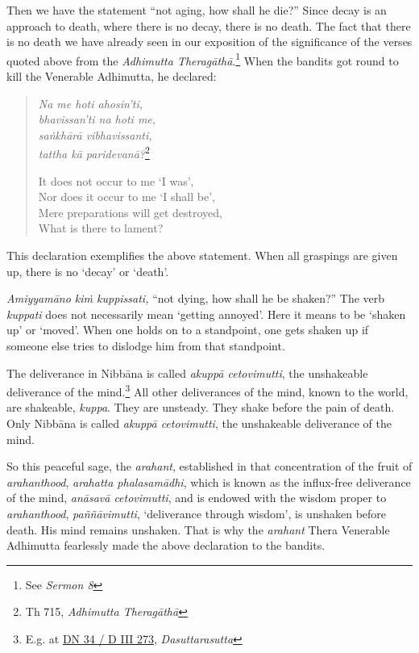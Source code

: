 Then we have the statement ``not aging, how shall he die?'' Since decay is an approach to death, where there is no decay, there is no death. The fact that there is no death we have already seen in our exposition of the significance of the verses quoted above from the \emph{Adhimutta Theragāthā}.\footnote{See \emph{Sermon 8}} When the bandits got round to kill the Venerable Adhimutta, he declared:

\begin{quote}
\emph{Na me hoti ahosin'ti,}\\
\emph{bhavissan'ti na hoti me,}\\
\emph{saṅkhārā vibhavissanti,}\\
\emph{tattha kā paridevanā?}\footnote{Th 715, \emph{Adhimutta Theragāthā}}

It does not occur to me `I was',\\
Nor does it occur to me `I shall be',\\
Mere preparations will get destroyed,\\
What is there to lament?
\end{quote}

This declaration exemplifies the above statement. When all graspings are given up, there is no `decay' or `death'.

\emph{Amiyyamāno kiṁ kuppissati,} ``not dying, how shall he be shaken?'' The verb \emph{kuppati} does not necessarily mean `getting annoyed'. Here it means to be `shaken up' or `moved'. When one holds on to a standpoint, one gets shaken up if someone else tries to dislodge him from that standpoint.

The deliverance in Nibbāna is called \emph{akuppā cetovimutti}, the unshakeable deliverance of the mind.\footnote{E.g. at \href{https://suttacentral.net/dn34/pli/ms}{DN 34 / D III 273}, \emph{Dasuttarasutta}} All other deliverances of the mind, known to the world, are shakeable, \emph{kuppa}. They are unsteady. They shake before the pain of death. Only Nibbāna is called \emph{akuppā cetovimutti}, the unshakeable deliverance of the mind.

So this peaceful sage, the \emph{arahant}, established in that concentration of the fruit of \emph{arahanthood}, \emph{arahatta phalasamādhi}, which is known as the influx-free deliverance of the mind, \emph{anāsavā cetovimutti}, and is endowed with the wisdom proper to \emph{arahanthood}, \emph{paññāvimutti}, `deliverance through wisdom', is unshaken before death. His mind remains unshaken. That is why the \emph{arahant} Thera Venerable Adhimutta fearlessly made the above declaration to the bandits.

